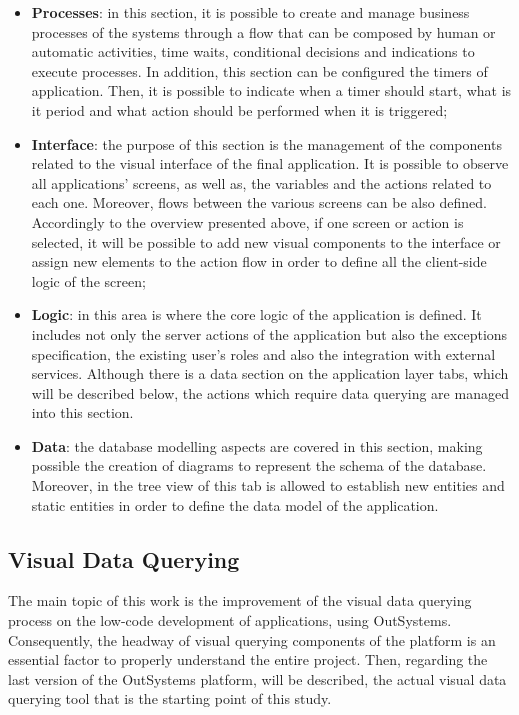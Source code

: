\begin{itemize}
	\item \textbf{Processes}: in this section, it is possible to create and manage business processes of the systems through a flow that can be composed by human or automatic activities, time waits, conditional decisions and indications to execute processes. In addition, this section can be configured the timers of application. Then, it is possible to indicate when a timer should start, what is it period and what action should be performed when it is triggered;
	\item \textbf{Interface}: the purpose of this section is the management of the components related to the visual interface of the final application. It is possible to observe all applications’ screens, as well as, the variables and the actions related to each one. Moreover, flows between the various screens can be also defined. Accordingly to the overview presented above, if one screen or action is selected, it will be possible to add new visual components to the interface or assign new elements to the action flow in order to define all the client-side logic of the screen;
	\item \textbf{Logic}: in this area is where the core logic of the application is defined. It includes not only the server actions of the application but also the exceptions specification, the existing user’s roles and also the integration with external services. Although there is a data section on the application layer tabs, which will be described below, the actions which require data querying are managed into this section.
	\item \textbf{Data}: the database modelling aspects are covered in this section, making possible the creation of diagrams to represent the schema of the database. Moreover, in the tree view of this tab is allowed to establish new entities and static entities in order to define the data model of the application.
\end{itemize}

\subsection{Visual Data Querying}
\label{subsec:visual_data_querying}

The main topic of this work is the improvement of the visual data querying process on the low-code development of applications, using OutSystems. Consequently, the headway of visual querying components of the platform is an essential factor to properly understand the entire project. Then, regarding the last version of the OutSystems platform, will be described, the actual visual data querying tool that is the starting point of this study.


